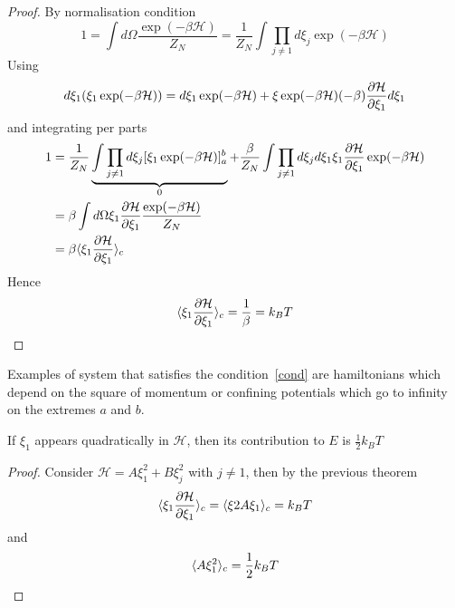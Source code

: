     \begin{proof}
        By normalisation condition 
        \begin{equation*}
            1 = \int d\Omega \frac{\exp(-\beta \mathcal H)}{Z_N} = \frac{1}{Z_N} \int \prod_{j \neq 1} d \xi_j \exp(-\beta \mathcal H)
        \end{equation*}
        Using
        \begin{equation*}
            d\xi_1 (\xi_1 \exp(-\beta \mathcal H)) = d\xi_1 \exp(-\beta \mathcal H) + \xi \exp(-\beta \mathcal H) (-\beta) \frac{\partial\mathcal H}{\partial\xi_1} d\xi_1
        \end{equation*}
        and integrating per parts
        \begin{equation*}
        \begin{aligned}        
            1 & = \frac{1}{Z_N} \underbrace{\int \prod_{j \neq 1} d \xi_j [\xi_1 \exp(-\beta \mathcal H)]_a^b}_{0} + \frac{\beta}{Z_N} \int \prod_{j \neq 1} d \xi_j d\xi_1 \xi_1 \frac{\partial\mathcal H}{\partial\xi_1} \exp (-\beta \mathcal H) \\ & = \beta \int d\Omega \xi_1 \frac{\partial\mathcal H}{\partial\xi_1} \frac{\exp (- \beta \mathcal H)}{Z_N} \\ & = \beta \langle\xi_1 \frac{\partial\mathcal H}{\partial\xi_1}\rangle_{c}
        \end{aligned}
        \end{equation*}
        Hence
        \begin{equation*}
            \langle\xi_1 \frac{\partial\mathcal H}{\partial\xi_1}\rangle_{c} = \frac{1}{\beta} = k_B T
        \end{equation*}
    \end{proof}

    Examples of system that satisfies the condition~\eqref{cond} are hamiltonians which depend on the square of momentum or confining potentials which go to infinity on the extremes $a$ and $b$. 

    \begin{corollary}
        If $\xi_1$ appears quadratically in $\mathcal H$, then its contribution to $E$ is $\frac{1}{2} k_B T$
    \end{corollary}

    \begin{proof}
        Consider $\mathcal H = A \xi_1^2 + B \xi_j^2$ with $j \neq 1$, then by the previous theorem 
        \begin{equation*}
            \langle\xi_1 \frac{\partial\mathcal H}{\partial\xi_1}\rangle_{c} = \langle\xi 2 A \xi_1\rangle_{c} = k_B T
        \end{equation*}
        and 
        \begin{equation*}
            \langle A \xi_1^2\rangle_{c} = \frac{1}{2} k_B T
        \end{equation*}
    \end{proof}

